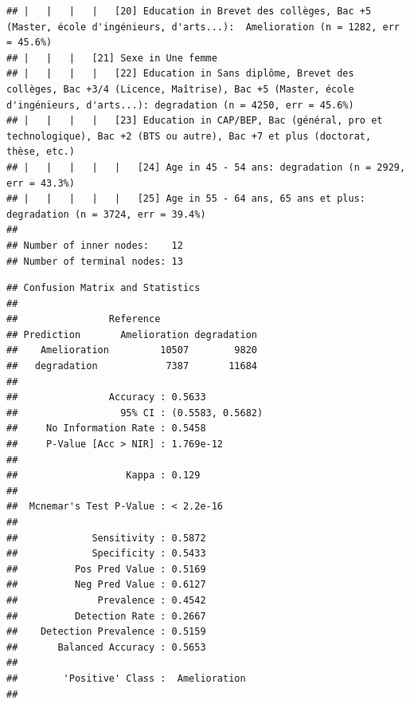 \documentclass[
]{book}
\newenvironment{Shaded}{\begin{snugshade}}{\end{snugshade}}
\newcommand{\FunctionTok}[1]{\textcolor[rgb]{0.00,0.00,0.00}{#1}}
\newcommand{\NormalTok}[1]{#1}
\newcommand{\OtherTok}[1]{\textcolor[rgb]{0.56,0.35,0.01}{#1}}
\newcommand{\SpecialCharTok}[1]{\textcolor[rgb]{0.00,0.00,0.00}{#1}}
\begin{document}
\begin{verbatim}
## |   |   |   |   [20] Education in Brevet des collèges, Bac +5 (Master, école d'ingénieurs, d'arts...):  Amelioration (n = 1282, err = 45.6%)
## |   |   |   [21] Sexe in Une femme
## |   |   |   |   [22] Education in Sans diplôme, Brevet des collèges, Bac +3/4 (Licence, Maîtrise), Bac +5 (Master, école d'ingénieurs, d'arts...): degradation (n = 4250, err = 45.6%)
## |   |   |   |   [23] Education in CAP/BEP, Bac (général, pro et technologique), Bac +2 (BTS ou autre), Bac +7 et plus (doctorat, thèse, etc.)
## |   |   |   |   |   [24] Age in 45 - 54 ans: degradation (n = 2929, err = 43.3%)
## |   |   |   |   |   [25] Age in 55 - 64 ans, 65 ans et plus: degradation (n = 3724, err = 39.4%)
## 
## Number of inner nodes:    12
## Number of terminal nodes: 13
\end{verbatim}

\begin{Shaded}
\end{Shaded}

\begin{verbatim}
## Confusion Matrix and Statistics
## 
##                Reference
## Prediction       Amelioration degradation
##    Amelioration         10507        9820
##   degradation            7387       11684
##                                           
##                Accuracy : 0.5633          
##                  95% CI : (0.5583, 0.5682)
##     No Information Rate : 0.5458          
##     P-Value [Acc > NIR] : 1.769e-12       
##                                           
##                   Kappa : 0.129           
##                                           
##  Mcnemar's Test P-Value : < 2.2e-16       
##                                           
##             Sensitivity : 0.5872          
##             Specificity : 0.5433          
##          Pos Pred Value : 0.5169          
##          Neg Pred Value : 0.6127          
##              Prevalence : 0.4542          
##          Detection Rate : 0.2667          
##    Detection Prevalence : 0.5159          
##       Balanced Accuracy : 0.5653          
##                                           
##        'Positive' Class :  Amelioration   
## 
\end{verbatim}
\end{document}
